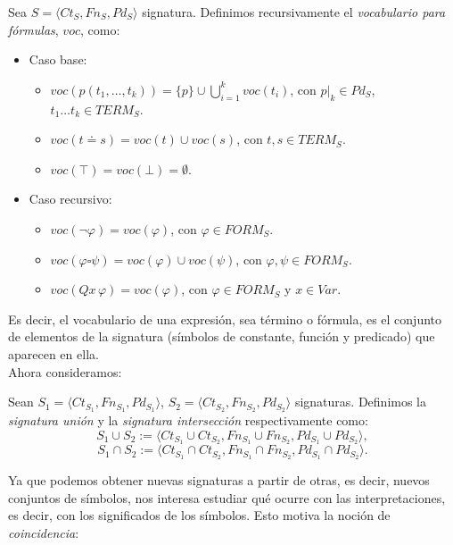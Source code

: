 \begin{definition}
Sea $S = \langle Ct_{S}, Fn_{S}, Pd_{S}\rangle$ signatura. Definimos recursivamente el \textit{vocabulario para fórmulas}, $voc$, como:
\begin{itemize}
    \item Caso base:
        \begin{itemize}
            \item $voc(p(t_1, \dots, t_k)) = \{ p\} \cup \bigcup \limits_{i = 1}^{k} voc(t_i)$, con $p|_k \in Pd_S$, $t_1 \dots t_k \in TERM_S$.
            \item $voc(t \doteq s) = voc(t) \cup voc(s)$, con $t, s\in TERM_S$.
            \item $voc(\top) = voc(\bot) = \emptyset$.
        \end{itemize}
    \item Caso recursivo:
        \begin{itemize}
            \item $voc(\neg \varphi) = voc(\varphi)$, con $\varphi \in FORM_S$.
            \item $voc(\varphi \square \psi) = voc(\varphi) \cup voc(\psi)$, con $\varphi, \psi \in FORM_S$.
            \item $voc(Qx \, \varphi) = voc(\varphi)$, con $\varphi \in FORM_S$ y $x \in Var$.
        \end{itemize}
\end{itemize}
\end{definition}

Es decir, el vocabulario de una expresión, sea término o fórmula, es el conjunto de elementos de la signatura (símbolos de constante, función y predicado) que aparecen en ella.\\

Ahora consideramos:

\begin{definition}
Sean $S_1 = \langle Ct_{S_1}, Fn_{S_1}, Pd_{S_1}\rangle$, $S_2 = \langle Ct_{S_2}, Fn_{S_2}, Pd_{S_2}\rangle$ signaturas. Definimos la \textit{signatura unión} y la \textit{signatura intersección} respectivamente como:
$$S_1 \cup S_2 := \langle Ct_{S_1} \cup Ct_{S_2}, Fn_{S_1} \cup Fn_{S_2}, Pd_{S_1} \cup Pd_{S_2} \rangle, $$
$$S_1 \cap S_2 := \langle Ct_{S_1} \cap Ct_{S_2}, Fn_{S_1} \cap Fn_{S_2}, Pd_{S_1} \cap Pd_{S_2} \rangle. $$
\end{definition}

Ya que podemos obtener nuevas signaturas a partir de otras, es decir, nuevos conjuntos de símbolos, nos interesa estudiar qué ocurre con las interpretaciones, es decir, con los significados de los símbolos. Esto motiva la noción de \textit{coincidencia}:

